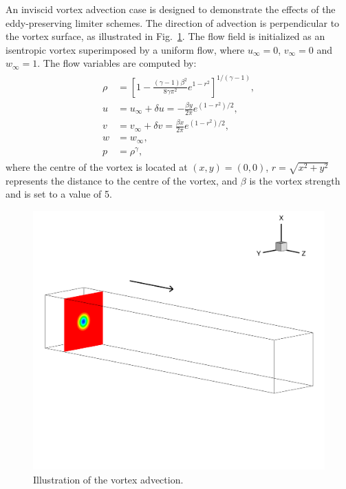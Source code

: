 An inviscid vortex advection case is designed to demonstrate the effects of the eddy-preserving limiter schemes. The direction of advection is perpendicular to the vortex surface, as illustrated in Fig.~\ref{vortex3d}.
The flow field is initialized as an isentropic vortex superimposed by a uniform flow, where $u_{\infty}=0$, $v_{\infty}=0$ and $w_{\infty}=1$. The flow variables are computed by:
\begin{align}
\begin{split} 
\rho&=[1-\frac{(\gamma-1)\beta^{2}}{8\gamma\pi^{2}}e^{1-r^{2}}]^{1/(\gamma-1)}, \\
u&=u_{\infty}+\delta u=- \frac{\beta y}{2\pi}e^{(1-r^{2})/2}, \\
v&=v_{\infty}+\delta v= \frac{\beta x}{2\pi}e^{(1-r^{2})/2}, \\
w&=w_{\infty}, \\
p&=\rho ^{\gamma},
\end{split}
\label{vor-equ}
\end{align}
where the centre of the vortex is located at $(x,y)=(0,0)$, $r=\sqrt{x^2+y^2}$ represents the distance to the centre of the vortex, and $\beta$ is the vortex strength and is set to a value of 5.
\begin{figure}[t]  
\centering
     \includegraphics[clip=true, trim= 1.75cm 11.0cm 1.75cm 0.5cm,width=0.99\linewidth]{./figures/vortex3d/vortex3d}                  
     \caption{Illustration of the vortex advection.}
     \label{vortex3d}
\end{figure}
